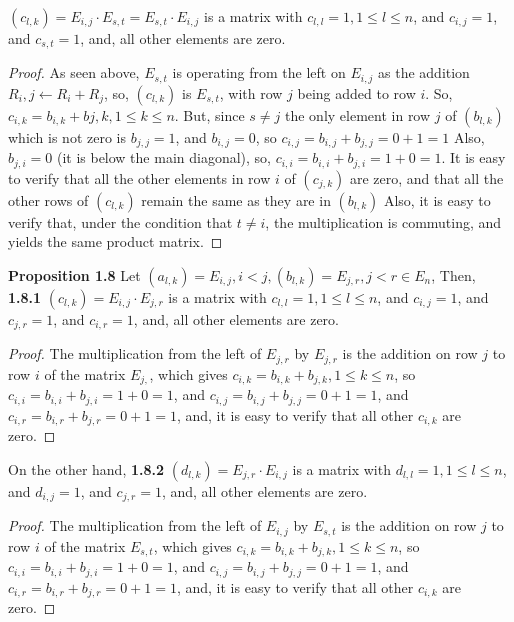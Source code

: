 \documentclass[12pt]{article}
\begin{document}
$(c_{l,k})=E_{i,j} \cdot E_{s,t}=E_{s,t} \cdot E_{i,j}$ is a matrix with $c_{l,l}=1,1 \leq l \leq n$, and $c_{i,j}=1$, and $c_{s,t}=1$, and, all other elements are zero.
\begin{proof}
As seen above, $E_{s,t}$ is operating from the left on $E_{i,j}$ as the addition $R_i,j \leftarrow R_i+R_j$, so, $(c_{l,k})$ is $E_{s,t}$, with row $j$ being added to row $i$. \newline
So, $c_{i,k}=b_{i,k}+b{j,k},1 \leq k \leq n$. But, since $s \neq j$ the only element in row $j$ of $(b_{l,k})$ which is not zero is $b_{j,j}=1$, and $b_{i,j}=0$, so $c_{i,j}=b_{i,j}+b_{j,j}=0+1=1$ \newline
Also, $b_{j,i}=0$ (it is below the main diagonal), so, $c_{i,i}=b_{i,i}+b_{j,i}=1+0=1$. \newline
It is easy to verify that all the other elements in row $i$ of $(c_{j,k})$ are zero, and that all the other rows of $(c_{l,k})$ remain the same as they are in $(b_{l,k})$ \newline
Also, it is easy to verify that, under the condition that $t \neq i$, the multiplication is commuting, and yields the same product matrix. 
\end{proof}
\textbf{Proposition 1.8} \newline
Let $(a_{l,k})=E_{i,j},i<j,(b_{l,k})=E_{j,r},j<r \in E_n$, Then, \newline
\textbf{1.8.1} $(c_{l,k})=E_{i,j} \cdot E_{j,r}$ is a matrix with $c_{l,l}=1,1 \leq l \leq n$, and $c_{i,j}=1$, and $c_{j,r}=1$, and $c_{i,r}=1$, and, all other elements are zero.
\begin{proof}
The multiplication from the left of $E_{j,r}$ by $E_{j,r}$ is the addition on row $j$ to row $i$ of the matrix $E_{j,}$, which gives $c_{i,k}=b_{i,k}+b_{j,k},1 \leq k \leq n$, so $c_{i,i}=b_{i,i}+b_{j,i}=1+0=1$, and $c_{i,j}=b_{i,j}+b_{j,j}=0+1=1$, and $c_{i,r}=b_{i,r}+b_{j,r}=0+1=1$, and, it is easy to verify that all other $c_{i,k}$ are zero. \newline
\end{proof}
On the other hand, \newline
\textbf{1.8.2} $(d_{l,k})=E_{j,r} \cdot E_{i,j}$ is a matrix with $d_{l,l}=1,1 \leq l \leq n$, and $d_{i,j}=1$, and $c_{j,r}=1$, and, all other elements are zero.
\begin{proof}
The multiplication from the left of $E_{i,j}$ by $E_{s,t}$ is the addition on row $j$ to row $i$ of the matrix $E_{s,t}$, which gives $c_{i,k}=b_{i,k}+b_{j,k},1 \leq k \leq n$, so $c_{i,i}=b_{i,i}+b_{j,i}=1+0=1$, and $c_{i,j}=b_{i,j}+b_{j,j}=0+1=1$, and $c_{i,r}=b_{i,r}+b_{j,r}=0+1=1$, and, it is easy to verify that all other $c_{i,k}$ are zero. 
\end{proof}
\end{document}
